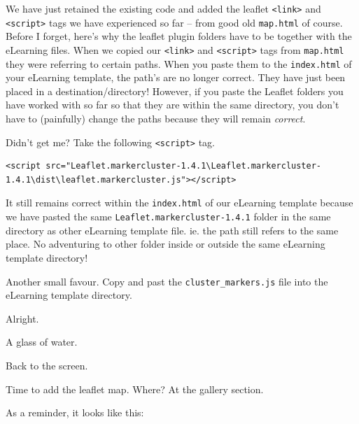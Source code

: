 \documentclass[
]{book}
\begin{document}
We have just retained the existing code and added the leaflet \texttt{\textless{}link\textgreater{}} and \texttt{\textless{}script\textgreater{}} tags we have experienced so far -- from good old \texttt{map.html} of course. Before I forget, here's why the leaflet plugin folders have to be together with the eLearning files. When we copied our \texttt{\textless{}link\textgreater{}} and \texttt{\textless{}script\textgreater{}} tags from \texttt{map.html} they were referring to certain paths. When you paste them to the \texttt{index.html} of your eLearning template, the path's are no longer correct. They have just been placed in a destination/directory! However, if you paste the Leaflet folders you have worked with so far so that they are within the same directory, you don't have to (painfully) change the paths because they will remain \emph{correct}.

Didn't get me? Take the following \texttt{\textless{}script\textgreater{}} tag.

\begin{verbatim}
<script src="Leaflet.markercluster-1.4.1\Leaflet.markercluster-1.4.1\dist\leaflet.markercluster.js"></script>
\end{verbatim}

It still remains correct within the \texttt{index.html} of our eLearning template because we have pasted the same \texttt{Leaflet.markercluster-1.4.1} folder in the same directory as other eLearning template file. ie. the path still refers to the same place. No adventuring to other folder inside or outside the same eLearning template directory!

Another small favour. Copy and past the \texttt{cluster\_markers.js} file into the eLearning template directory.

Alright.

A glass of water.

Back to the screen.

Time to add the leaflet map. Where? At the gallery section.

As a reminder, it looks like this:
\end{document}
